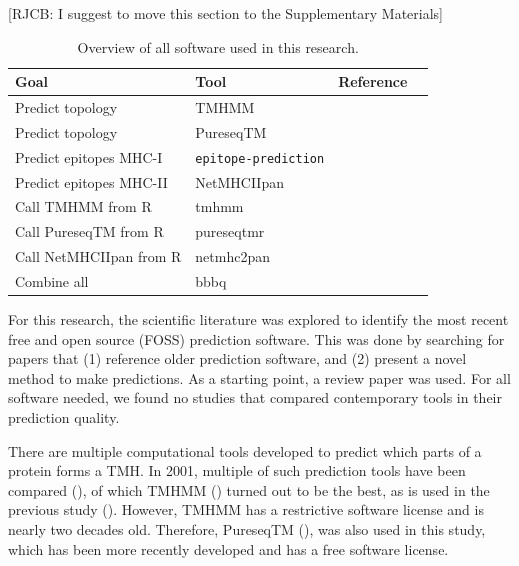 [RJCB: I suggest to move this section to the Supplementary Materials]
\begin{table}[]
  \begin{tabular}{llll}
    Goal & Tool & Reference \\ 
    \hline
    Predict topology                  & TMHMM                     & \cite{krogh2001predicting} \\
    Predict topology                  & PureseqTM                 & \cite{wang2019efficient} \\
    Predict epitopes MHC-I            & \verb;epitope-prediction; & \cite{bianchi2017} \\
    Predict epitopes MHC-II           & NetMHCIIpan               & \cite{nielsen2008quantitative,karosiene2013netmhciipan} \\
    Call TMHMM from R                 & tmhmm                     & \cite{tmhmm} \\
    Call PureseqTM from R             & pureseqtmr                & \cite{pureseqtmr} \\
    Call NetMHCIIpan from R           & netmhc2pan                & \cite{netmhc2pan} \\
    Combine all                       & bbbq                      & \cite{bbbq}
  \end{tabular}
  \caption{
    Overview of all software used in this research.
  }
  \label{table:software_used}
\end{table}

For this research, the scientific literature was explored 
to identify the most recent free and open source (FOSS) prediction software.
This was done by searching for papers that (1) reference older
prediction software, and (2) present a novel method to make predictions.
As a starting point, a review paper was used.
For all software needed, we found no studies that compared contemporary tools 
in their prediction quality.


There are multiple computational tools developed to predict which
parts of a protein forms a TMH.
In 2001, multiple of such prediction tools have been compared (\cite{moller2001evaluation}),
of which TMHMM (\cite{krogh2001predicting}) turned out to be the best, 
as is used in the previous study (\cite{bianchi2017}).
However, TMHMM has a restrictive software license and is nearly two
decades old.
Therefore, PureseqTM (\cite{wang2019efficient}),
was also used in this study, which has been more recently developed
and has a free software license.

